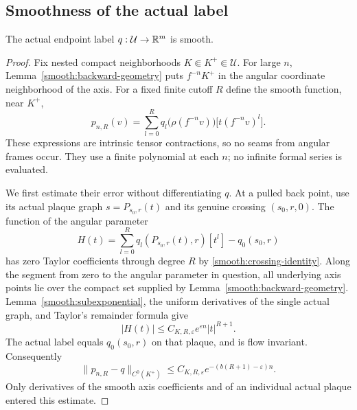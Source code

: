 \subsection{Smoothness of the actual label}

\begin{proposition}
\label{smooth:propagation}
The actual endpoint label $q:\mathcal U\to\mathbb R^m$ is smooth.
\end{proposition}

\begin{proof}
Fix nested compact neighborhoods $K\Subset K^+\Subset\mathcal U$.
For large $n$, Lemma~\ref{smooth:backward-geometry} puts $f^{-n}K^+$ in
the angular coordinate neighborhood of the axis.  For a fixed finite
cutoff $R$ define the smooth function, near $K^+$,
\begin{equation}
 \label{smooth:approximants}
 p_{n,R}(v)=\sum_{l=0}^R
 q_l\bigl(\rho(f^{-n}v)\bigr)
       \bigl[t(f^{-n}v)^l\bigr].
\end{equation}
These expressions are intrinsic tensor contractions, so no seams from
angular frames occur.  They use a finite polynomial at each $n$; no
infinite formal series is evaluated.

We first estimate their error without differentiating $q$.  At a pulled
back point, use its actual plaque graph
$s=P_{s_0,r}(t)$ and its genuine crossing $(s_0,r,0)$.  The function of
the angular parameter
\[
 H(t)=\sum_{l=0}^R q_l(P_{s_0,r}(t),r)[t^l]-q_0(s_0,r)
\]
has zero Taylor coefficients through degree $R$ by
\eqref{smooth:crossing-identity}.  Along the segment from zero to the
angular parameter in question, all underlying axis points lie over the
compact set supplied by Lemma~\ref{smooth:backward-geometry}.
Lemma~\ref{smooth:subexponential}, the uniform derivatives of the
single actual graph, and Taylor's remainder formula give
\[
 |H(t)|\leq C_{K,R,\varepsilon}e^{\varepsilon n}|t|^{R+1}.
\]
The actual label equals $q_0(s_0,r)$ on that plaque, and is flow
invariant.  Consequently
\begin{equation}
 \label{smooth:approximation-error}
 \|p_{n,R}-q\|_{C^0(K^+)}
 \leq C_{K,R,\varepsilon}
       e^{-(b(R+1)-\varepsilon)n}.
\end{equation}
Only derivatives of the smooth axis coefficients and of an individual
actual plaque entered this estimate.


\end{proof}
